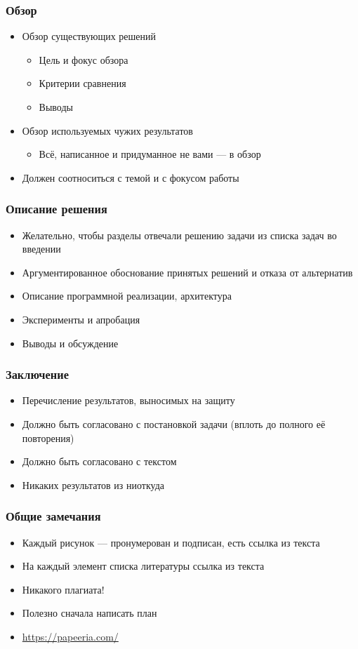 \documentclass[xetex,mathserif,serif]{beamer}
\begin{document}
	\begin{frame}
		\frametitle{Обзор}
		\begin{itemize}
			\item Обзор существующих решений
			\begin{itemize}
				\item Цель и фокус обзора
				\item Критерии сравнения
				\item Выводы
			\end{itemize}
			\item Обзор используемых чужих результатов
			\begin{itemize}
				\item  Всё, написанное и придуманное не вами --- в обзор
			\end{itemize}
			\item Должен соотноситься с темой и с фокусом работы
		\end{itemize}
	\end{frame}

	\begin{frame}
		\frametitle{Описание решения}
		\begin{itemize}
			\item Желательно, чтобы разделы отвечали решению задачи из списка задач во введении
			\item Аргументированное обоснование принятых решений и отказа от альтернатив
			\item Описание программной реализации, архитектура
			\item Эксперименты и апробация
			\item Выводы и обсуждение
		\end{itemize}
	\end{frame}

	\begin{frame}
		\frametitle{Заключение}
		\begin{itemize}
			\item Перечисление результатов, выносимых на защиту
			\item Должно быть согласовано с постановкой задачи (вплоть до полного её повторения)
			\item Должно быть согласовано с текстом
			\item Никаких результатов из ниоткуда
		\end{itemize}
	\end{frame}

	\begin{frame}
		\frametitle{Общие замечания}
		\begin{itemize}
			\item Каждый рисунок --- пронумерован и подписан, есть ссылка из текста
			\item На каждый элемент списка литературы ссылка из текста
			\item Никакого плагиата!
			\item Полезно сначала написать план
			\item \url{https://papeeria.com/}
		\end{itemize}
	\end{frame}
\end{document}
